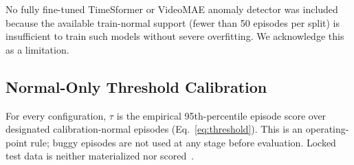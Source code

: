 No fully fine-tuned TimeSformer or VideoMAE anomaly detector was included because the available
train-normal support (fewer than 50 episodes per split) is insufficient to train such models
without severe overfitting. We acknowledge this as a limitation.

\subsection{Normal-Only Threshold Calibration}

For every configuration, $\tau$ is the empirical 95th-percentile episode score over designated
calibration-normal episodes (Eq.~\ref{eq:threshold}). This is an operating-point rule;
buggy episodes are not used at any stage before evaluation. Locked test data is neither
materialized nor scored~\cite{kaufman2011leakage}.
